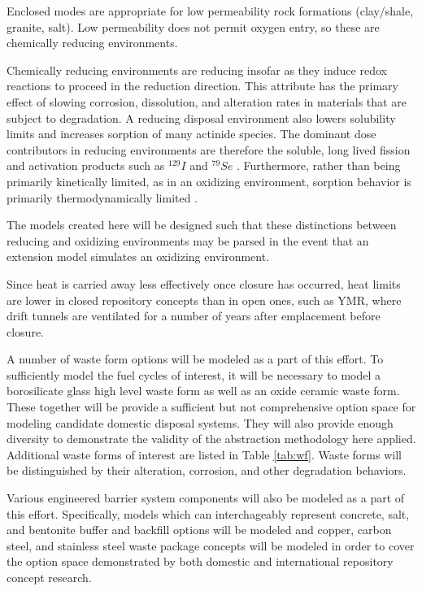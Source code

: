 Enclosed modes are appropriate for low permeability rock formations (clay/shale, 
granite, salt).  Low permeability does not permit oxygen entry, so these are
chemically reducing environments.  

Chemically reducing environments are reducing insofar as they induce redox 
reactions to proceed in the reduction direction. This attribute has the primary 
effect of slowing corrosion, dissolution, and  alteration rates in materials 
that are subject to degradation. A reducing disposal environment also lowers 
solubility limits and increases sorption of many actinide species. The dominant 
dose contributors in reducing environments are therefore the soluble, long 
lived fission and activation products such as $^{129}I$ and $^{79}Se$ 
\cite{oecd-nea_advanced_2006, von_lensa_red-impact_2008}.  Furthermore, rather 
than being primarily kinetically limited, as in an oxidizing environment, 
sorption behavior is primarily thermodynamically limited 
\cite{nutt_personal_2011, schwartz_fundamentals_2004}. 

The models created here will be designed such that these distinctions between 
reducing and oxidizing environments may be parsed in the event that an 
extension model simulates an oxidizing environment. 

Since heat is carried away less effectively once closure 
has occurred, heat limits are lower in  closed repository concepts than in open 
ones, such as \gls{YMR}, where drift tunnels are ventilated for a number of years
after emplacement before closure.

A number of waste form options will be modeled as a part of this effort. To 
sufficiently model the fuel cycles of interest, it will be necessary to model 
a borosilicate glass high level waste form as well as an oxide ceramic waste 
form. These together will be provide a sufficient but not comprehensive option 
space for modeling candidate domestic disposal systems. They will also provide 
enough diversity to demonstrate the validity of the abstraction methodology here 
applied. Additional waste forms 
of interest are listed in Table \ref{tab:wf}. Waste forms will be 
distinguished by their alteration, corrosion, and other degradation behaviors.

Various engineered barrier system components will also be modeled as a part of 
this effort.  Specifically, models which can interchageably represent concrete, 
salt, and bentonite buffer and backfill options will be modeled and copper, 
carbon steel, and stainless steel waste package concepts  will be modeled in 
order to cover the option space demonstrated by both domestic and international 
repository concept research. 


